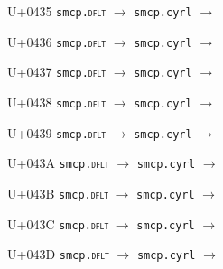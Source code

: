 \documentclass{article}
\begin{document}
\begin{substitutions}
\goodbreak

U+0435  \linebreak
    \texttt{smcp.\textsc{dflt}} $\to$  \linebreak
    \texttt{smcp.cyrl} $\to$  

\goodbreak

U+0436  \linebreak
    \texttt{smcp.\textsc{dflt}} $\to$  \linebreak
    \texttt{smcp.cyrl} $\to$  

\goodbreak

U+0437  \linebreak
    \texttt{smcp.\textsc{dflt}} $\to$  \linebreak
    \texttt{smcp.cyrl} $\to$  

\goodbreak

U+0438  \linebreak
    \texttt{smcp.\textsc{dflt}} $\to$  \linebreak
    \texttt{smcp.cyrl} $\to$  

\goodbreak

U+0439  \linebreak
    \texttt{smcp.\textsc{dflt}} $\to$  \linebreak
    \texttt{smcp.cyrl} $\to$  

\goodbreak

U+043A  \linebreak
    \texttt{smcp.\textsc{dflt}} $\to$  \linebreak
    \texttt{smcp.cyrl} $\to$  

\goodbreak

U+043B  \linebreak
    \texttt{smcp.\textsc{dflt}} $\to$  \linebreak
    \texttt{smcp.cyrl} $\to$  

\goodbreak

U+043C  \linebreak
    \texttt{smcp.\textsc{dflt}} $\to$  \linebreak
    \texttt{smcp.cyrl} $\to$  

\goodbreak

U+043D  \linebreak
    \texttt{smcp.\textsc{dflt}} $\to$  \linebreak
    \texttt{smcp.cyrl} $\to$  


\end{substitutions}
\end{document}
